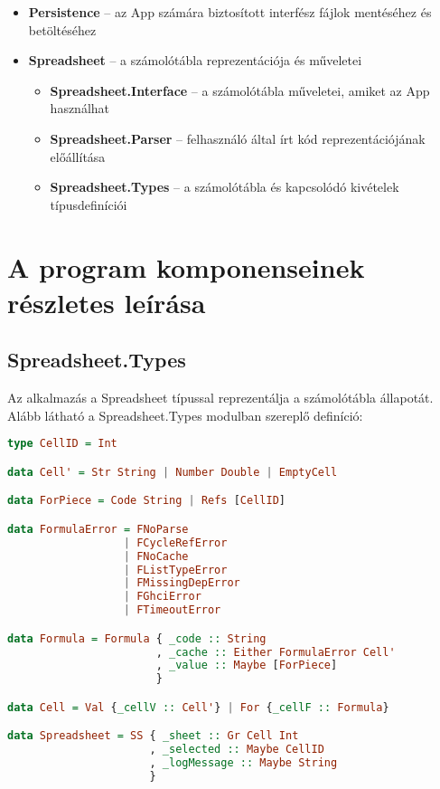 \begin{itemize}
	\item \textbf{Persistence} -- az App számára biztosított interfész fájlok mentéséhez és betöltéséhez
	\item \textbf{Spreadsheet} -- a számolótábla reprezentációja és műveletei
	\begin{itemize}
		\item \textbf{Spreadsheet.Interface} -- a számolótábla műveletei, amiket az App használhat
		\item \textbf{Spreadsheet.Parser} -- felhasználó által írt kód reprezentációjának előállítása
		\item \textbf{Spreadsheet.Types} -- a számolótábla és kapcsolódó kivételek típusdefiníciói
	\end{itemize}
\end{itemize} 

\section{A program komponenseinek részletes leírása}

\subsection{Spreadsheet.Types}

Az alkalmazás a Spreadsheet típussal reprezentálja a számolótábla állapotát. Alább látható a Spreadsheet.Types modulban szereplő definíció:

\begin{lstlisting}[language={Haskell}]
type CellID = Int

data Cell' = Str String | Number Double | EmptyCell

data ForPiece = Code String | Refs [CellID]

data FormulaError = FNoParse
                  | FCycleRefError
                  | FNoCache
                  | FListTypeError
                  | FMissingDepError
                  | FGhciError
                  | FTimeoutError

data Formula = Formula { _code :: String
                       , _cache :: Either FormulaError Cell'
                       , _value :: Maybe [ForPiece]
                       }

data Cell = Val {_cellV :: Cell'} | For {_cellF :: Formula}

data Spreadsheet = SS { _sheet :: Gr Cell Int
                      , _selected :: Maybe CellID
                      , _logMessage :: Maybe String
                      }
\end{lstlisting}

